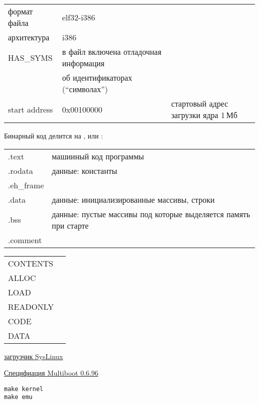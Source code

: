 \begin{tabular}{l l l}
формат файла & elf32-i386 \\
архитектура & i386 \\
HAS\_SYMS & в файл включена отладочная информация \\& об идентификаторах
(``символах'')\\
start address & 0x00100000 & стартовый адрес загрузки ядра 1\,Мб\\
\end{tabular}

\bigskip
Бинарный код делится на , или
:

\begin{tabular}{l l}
.text & машииный код программы \\
.rodata & данные: константы \\
.eh\_frame &\\
.data & данные: инициализированные массивы, строки \\
.bss & данные: пустые массивы под которые выделяется память при старте \\
.comment &\\
\end{tabular}

\bigskip
\begin{tabular}{l l}
CONTENTS & \\
ALLOC & \\
LOAD & \\
READONLY & \\
CODE & \\
DATA & \\
\end{tabular}



\href{http://www.syslinux.org/}{загрузчик SysLinux}

\href{http://www.gnu.org/software/grub/manual/multiboot/multiboot.html}{Специфиация
Multiboot 0.6.96}

\secdown

\begin{verbatim}
make kernel
make emu
\end{verbatim}



\secup

\secdown




\secdown
{}
\secup

\secup

\secup
